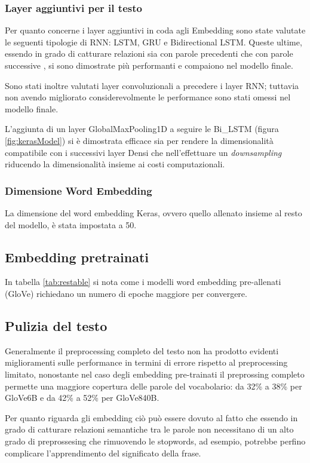 \subsubsection{Layer aggiuntivi per il testo}

Per quanto concerne i layer aggiuntivi in coda agli Embedding sono state
valutate le seguenti tipologie di RNN: LSTM, GRU e Bidirectional LSTM. Queste
ultime, essendo in grado di catturare relazioni sia con parole precedenti che
con parole successive \cite{schuster1997bidirectional}, si sono dimostrate più
performanti e compaiono nel modello finale.

Sono stati inoltre valutati layer convoluzionali a precedere i layer RNN; tuttavia
non avendo migliorato considerevolmente le performance sono stati omessi nel
modello finale.

L'aggiunta di un layer GlobalMaxPooling1D a seguire le Bi\_LSTM (figura
\ref{fig:kerasModel}) si è dimostrata efficace sia per rendere la dimensionalità
compatibile con i successivi layer Densi che nell'effettuare un
\textit{downsampling} riducendo la dimensionalità insieme ai costi
computazionali.

\subsubsection{Dimensione Word Embedding}
La dimensione del word embedding Keras, ovvero quello allenato insieme al resto
del modello, è stata impostata a 50.

\subsection{Embedding pretrainati}
In tabella \ref{tab:restable} si nota come i modelli word embedding
pre-allenati (GloVe) richiedano un numero di epoche maggiore per convergere.

\subsection{Pulizia del testo}

Generalmente il preprocessing completo del testo non ha prodotto evidenti
miglioramenti sulle performance in termini di errore rispetto al preprocessing
limitato, nonostante nel caso degli embedding pre-trainati il preprossing
completo permette una maggiore copertura delle parole del vocabolario: da 32\%
a 38\% per GloVe6B e da 42\% a 52\% per GloVe840B.

Per quanto riguarda gli embedding ciò può essere dovuto al fatto che essendo in grado di catturare relazioni semantiche tra le parole non
necessitano di un alto grado di preprossesing che rimuovendo le stopwords, ad
esempio, potrebbe perfino complicare l'apprendimento del significato della
frase.

